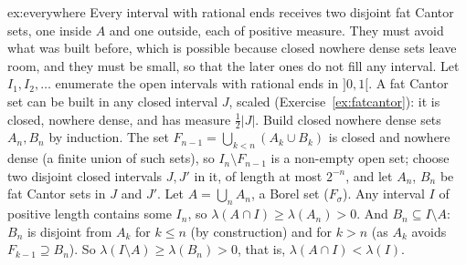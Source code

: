 \begin{solution}{ex:everywhere}
\idea Every interval with rational ends receives two disjoint fat Cantor sets, one inside $A$ and one outside, each of positive measure. They must avoid what was
built before, which is possible because closed nowhere dense sets leave room, and they must be small, so that the later ones do not fill any interval.
\writeup Let $I_1,I_2,\ldots$ enumerate the open intervals with rational ends in $]0,1[$. A fat Cantor set can be built in any closed interval $J$, scaled (Exercise~\ref{ex:fatcantor}):
it is closed, nowhere dense, and has measure $\frac12|J|$. Build closed nowhere dense sets $A_n,B_n$ by induction. The set $F_{n-1}=\bigcup_{k<n}(A_k\cup B_k)$ is closed and
nowhere dense (a finite union of such sets), so $I_n\setminus F_{n-1}$ is a non-empty open set; choose two disjoint closed intervals $J,J'$ in it, of length at most $2^{-n}$, and let $A_n$, $B_n$ be
fat Cantor sets in $J$ and $J'$. Let $A=\bigcup_nA_n$, a Borel set ($F_\sigma$). Any interval $I$ of positive length contains some $I_n$, so $\lambda(A\cap I)\ge\lambda(A_n)>0$. And $B_n\subseteq I\setminus A$:
$B_n$ is disjoint from $A_k$ for $k\le n$ (by construction) and for $k>n$ (as $A_k$ avoids $F_{k-1}\supseteq B_n$). So $\lambda(I\setminus A)\ge\lambda(B_n)>0$, that is, $\lambda(A\cap I)<\lambda(I)$.
\end{solution}

